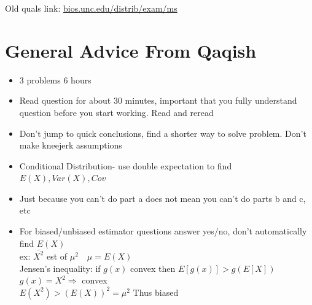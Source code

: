 \documentclass{article}
\newcommand{\ra}{\Rightarrow}
\begin{document}
\begin{flushleft}
Old quals link: \underline{bios.unc.edu/distrib/exam/ms}
\section*{General Advice From Qaqish}
\begin{itemize}
\item 3 problems 6 hours
\item Read question for about 30 minutes, important that you fully understand question before you start working. Read and reread
\item Don't jump to quick conclusions, find a shorter way to solve problem. Don't make kneejerk assumptions
\item Conditional Distribution- use double expectation to find $E(X), Var(X), Cov$
\item Just because you can't do part a does not mean you can't do parts b and c, etc
\item For biased/unbiased estimator questions answer yes/no, don't automatically find $E(X)$\\
ex: $\bar{X^2}$ est of $\mu^2 \quad \mu=E(X)$\\
Jensen's inequality: if $g(x)$ convex then $E[g(x)]>g(E[X])$\\
$g(x)=X^2 \ra$ convex\\
$E(X^2)>(E(X))^2=\mu^2$ Thus biased
\end{itemize}


\end{flushleft}
\end{document}
